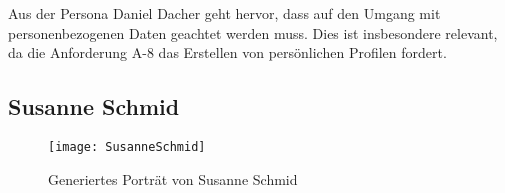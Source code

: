 Aus der Persona \glqq{}Daniel Dacher\grqq{} geht hervor, dass auf den Umgang mit personenbezogenen Daten geachtet werden muss. \newline
Dies ist insbesondere relevant, da die Anforderung A-8 das Erstellen von persönlichen Profilen fordert.


\pagebreak
\subsection{Susanne Schmid}
\label{subsec:susanneschmid}

\begin{figure}[htpb]
    \centering
    \texttt{[image: SusanneSchmid]}
    \caption{Generiertes Porträt von Susanne Schmid \cite{misc:susanneschmid}}
    \label{img:susanneschmid}
\end{figure}

